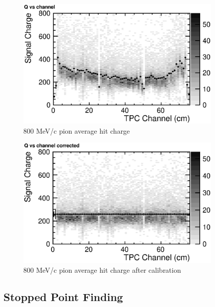 \begin{figure}[htbp]
 \begin{center}
  \includegraphics[width=100mm]{fig/PionQvsCh.eps}
 \end{center}
 \caption{800 MeV/c pion average hit charge}
 \label{fig:PionQvsCh}
\end{figure}

\begin{figure}[htbp]
 \begin{center}
  \includegraphics[width=100mm]{fig/PionQcvsCh.eps}
 \end{center}
 \caption{800 MeV/c pion average hit charge after calibration}
 \label{fig:PionQcvsCh}
\end{figure}

\subsection{Stopped Point Finding}
%


